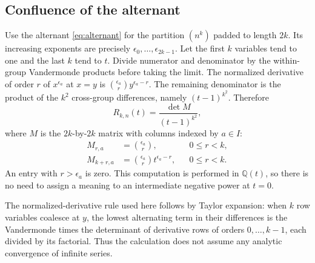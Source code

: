\documentclass[11pt,a4paper]{article}
\theoremstyle{definition}
\theoremstyle{remark}
\newcommand{\Q}{\mathbb Q}
\numberwithin{equation}{section}
\begin{document}
\subsection{Confluence of the alternant}
Use the alternant \eqref{eq:alternant} for the partition \((n^k)\) padded
to length \(2k\). Its increasing exponents are precisely
\(\epsilon_0,\ldots,\epsilon_{2k-1}\).
Let the first \(k\) variables tend to one and the last \(k\) tend to \(t\).
Divide numerator and denominator by the within-group Vandermonde products
before taking the limit. The normalized derivative of order \(r\) of
\(x^{\epsilon_a}\) at \(x=y\) is
\(\binom{\epsilon_a}{r}y^{\epsilon_a-r}\).
The remaining denominator is the product of the \(k^2\) cross-group
differences, namely \((t-1)^{k^2}\). Therefore
\begin{equation}
 R_{k,n}(t)=\frac{\det M}{(t-1)^{k^2}},
 \label{eq:confluent}
\end{equation}
where \(M\) is the \(2k\)-by-\(2k\) matrix with columns indexed by \(a\in I\):
\begin{align}
 M_{r,a}&=\binom{\epsilon_a}{r},&&0\le r<k,\label{eq:M-top}\\
 M_{k+r,a}&=\binom{\epsilon_a}{r}t^{\epsilon_a-r},&&0\le r<k.
 \label{eq:M-bottom}
\end{align}
An entry with \(r>\epsilon_a\) is zero. This computation is performed in
\(\Q(t)\), so there is no need to assign a meaning to an intermediate
negative power at \(t=0\).

The normalized-derivative rule used here follows by Taylor expansion:
when \(k\) row variables coalesce at \(y\), the lowest alternating term
in their differences is the Vandermonde times the determinant of derivative
rows of orders \(0,\ldots,k-1\), each divided by its factorial. Thus the
calculation does not assume any analytic convergence of infinite series.
\end{document}
